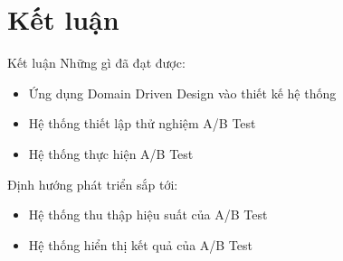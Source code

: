 \section{Kết luận}


\begin{frame}{Kết luận}
	Những gì đã đạt được:
	\begin{itemize}
		\item Ứng dụng Domain Driven Design vào thiết kế hệ thống 
		\item Hệ thống thiết lập thử nghiệm A/B Test
		\item Hệ thống thực hiện A/B Test
	\end{itemize}
	Định hướng phát triển sắp tới:
	\begin{itemize}
		\item Hệ thống thu thập hiệu suất của A/B Test
		\item Hệ thống hiển thị kết quả của A/B Test
	\end{itemize}
\end{frame}


